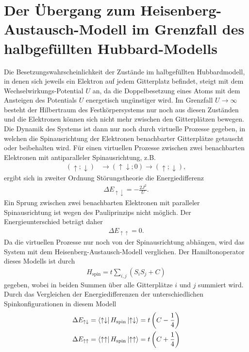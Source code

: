 \section{Der Übergang zum Heisenberg-Austausch-Modell im Grenzfall des halbgefüllten Hubbard-Modells}

Die Besetzungswahrscheinlichkeit der Zustände im halbgefüllten Hubbardmodell, in denen sich jeweils ein Elektron auf jedem Gitterplatz befindet, steigt mit dem Wechselwirkungs-Potential $U$ an, da
die Doppelbesetzung eines Atoms mit dem Ansteigen des Potentials $U$ energetisch ungünstiger wird. Im Grenzfall $U \to \infty$ besteht der Hilbertraum des Festkörpersystems nur noch aus diesen Zuständen
und die Elektronen können sich nicht mehr zwischen den Gitterplätzen bewegen. Die Dynamik des Systems ist dann nur noch durch virtuelle Prozesse gegeben, in welchen die Spinausrichtung der Elektronen
benachbarter Gitterplätze getauscht oder beibehalten wird. Für einen virtuellen Prozesse zwischen zwei benachbarten Elektronen mit antiparalleler Spinausrichtung, z.B.
\begin{align}
  (\uparrow; \downarrow) &\to (\uparrow \downarrow ; 0) \to (\uparrow; \downarrow),
\end{align}
ergibt sich in zweiter Ordnung Störungstheorie die Energiedifferenz
\begin{align}
  \Delta E_{\uparrow \downarrow} = - \frac{2J^2}{U}.
  \label{eqn:Ediffantipar}
\end{align}
Ein Sprung zwischen zwei benachbarten Elektronen mit paralleler Spinausrichtung ist wegen des Pauliprinzips nicht möglich.
Der Energieunterschied beträgt daher
\begin{align}
  \Delta E_{\uparrow \uparrow} = 0.
  \label{eqn:Ediffpar}
\end{align}
Da die virtuellen Prozesse nur noch von der Spinausrichtung abhängen, wird das System mit dem Heisenberg-Austausch-Modell verglichen.
Der Hamiltonoperator dieses Modells ist durch
\begin{align}
  H_\text{spin} = t \sum_{i,j} (S_i S_j + C)
  \label{eqn:hamiltonspincj}
\end{align}
gegeben, wobei in beiden Summen über alle Gitterplätze $i$ und $j$ summiert wird. Durch das Vergleichen der Energiedifferenzen der unterschiedlichen Spinkonfigurationen in diesem Modell
\begin{align}
  \Delta E_{\uparrow \downarrow} = \bra{\uparrow \downarrow} H_\text{spin} \ket{\uparrow \downarrow} = t\left(C - \frac14\right) \\
  \Delta E_{\uparrow \uparrow} = \bra{\uparrow \uparrow} H_\text{spin} \ket{\uparrow \uparrow} = t\left(C + \frac14\right)
\end{align}
